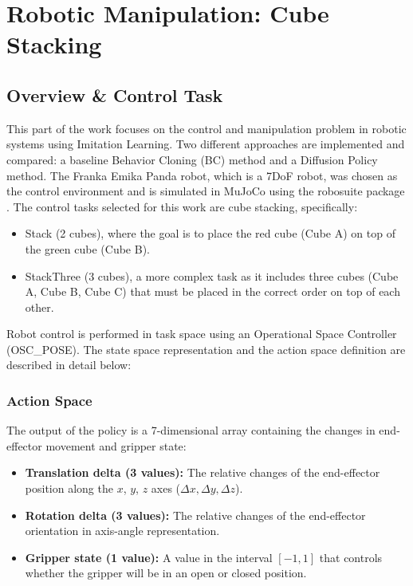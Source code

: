 \documentclass[11pt,a4paper]{article}
\begin{document}
\clearpage
\section{Robotic Manipulation: Cube Stacking}

\subsection{Overview \& Control Task}
This part of the work focuses on the control and manipulation problem in robotic systems using Imitation Learning. Two different approaches are implemented and compared: a baseline Behavior Cloning (BC) method and a Diffusion Policy method.
The Franka Emika Panda robot, which is a 7DoF robot, was chosen as the control environment and is simulated in MuJoCo using the robosuite package \cite{robosuite2020}. The control tasks selected for this work are cube stacking, specifically:
\begin{itemize}
    \item Stack (2 cubes), where the goal is to place the red cube (Cube A) on top of the green cube (Cube B).
    \item StackThree (3 cubes), a more complex task as it includes three cubes (Cube A, Cube B, Cube C) that must be placed in the correct order on top of each other.
\end{itemize}

Robot control is performed in task space using an Operational Space Controller (OSC\_POSE).
The state space representation and the action space definition are described in detail below:

\subsubsection{Action Space}
The output of the policy is a 7-dimensional array containing the changes in end-effector movement and gripper state:
\begin{itemize}
    \item \textbf{Translation delta (3 values):} The relative changes of the end-effector position along the $x$, $y$, $z$ axes ($\Delta x, \Delta y, \Delta z$).
    \item \textbf{Rotation delta (3 values):} The relative changes of the end-effector orientation in axis-angle representation.
    \item \textbf{Gripper state (1 value):} A value in the interval $[-1, 1]$ that controls whether the gripper will be in an open or closed position.
\end{itemize}
\end{document}
